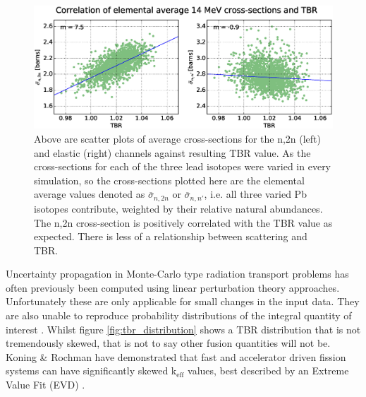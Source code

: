 \begin{figure}[ht]
  \centering
	\includegraphics[width=\textwidth]{pb_tbr_n2n_el_corr}
	\caption{Above are scatter plots of average cross-sections for the n,2n (left) and elastic (right) channels against resulting TBR value. As the cross-sections for each of the three lead isotopes were varied in every simulation, so the cross-sections plotted here are the elemental average values denoted as $\overline{\sigma}_{n,2n}$ or $\overline{\sigma}_{n,n'}$, i.e. all three varied Pb isotopes contribute, weighted by their relative natural abundances. The n,2n cross-section is positively correlated with the TBR value as expected. There is less of a relationship between scattering and TBR.}
	\label{fig:tbr_n2n}
\end{figure}




Uncertainty propagation in Monte-Carlo type radiation transport problems has often previously been computed using linear perturbation theory approaches. Unfortunately these are only applicable for small changes in the input data. They are also unable to reproduce probability distributions of the integral quantity of interest \cite{Rising2012}. Whilst figure \ref{fig:tbr_distribution} shows a TBR distribution that is not tremendously skewed, that is not to say other fusion quantities will not be. Koning \& Rochman have demonstrated that fast and accelerator driven fission systems can have significantly skewed k$_{\mbox{eff}}$ values, best described by an Extreme Value Fit (EVD) \cite{Koning2008}.

